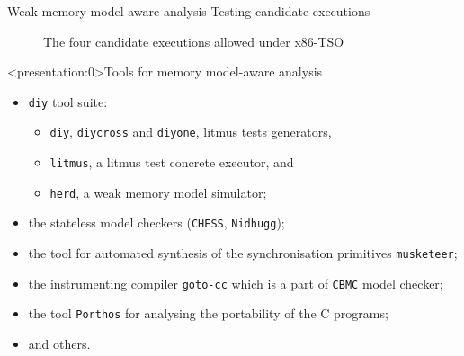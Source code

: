 \documentclass[aspectratio=149]{beamer}
\newcommand{\tool}[1]{\texttt{#1}}
\begin{document}
\begin{frame}{Weak memory model-aware analysis} {Testing candidate executions}
{\begin{figure}
\caption{The four candidate executions allowed under x86-TSO}
\end{figure}
}

\end{frame}




\begin{frame}<presentation:0>{Tools for memory model-aware analysis}
\begin{itemize}
\item \texttt{diy} tool suite:
  \begin{itemize}
  \item \tool{diy}, \tool{diycross} and \tool{diyone}, litmus tests generators,
  \item \tool{litmus}, a litmus test concrete executor, and 
  \item \tool{herd}, a weak memory model simulator;
  \end{itemize}
\item the stateless model checkers (\tool{CHESS}, \tool{Nidhugg}); %
\item the tool for automated synthesis of the synchronisation primitives \tool{musketeer};
\item the instrumenting compiler \tool{goto-cc} which is a part of \tool{CBMC} model checker;
\item the tool \texttt{Porthos} for analysing the portability of the C programs;
\item and others.
\end{itemize}
\end{frame}
\end{document}
